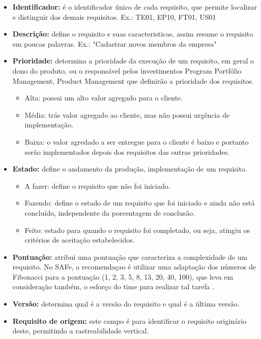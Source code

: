 \begin{itemize}
    \item \textbf{Identificador:} é o identificador único de cada requisito, que permite localizar e distinguir dos demais requisitos.
    \newline Ex.: TE01, EP10, FT01, US01
    \item \textbf{Descrição:} define o requisito e suas caracteristicas, assim resume o requisito em poucas palavras.
    \newline Ex.: "Cadastrar novos membros da empresa" 
    \item \textbf{Prioridade:} determina a prioridade da execução de um requisito, em geral o dono do produto, ou o responsável pelos investimentos Program Portfólio Management, Product Management que definirão a prioridade dos requisitos.
    \begin{itemize}
        \item Alta: possui um alto valor agregado para o cliente.
        \item Média: trás valor agregado ao cliente, mas não possui urgência de implementação.
        \item Baixa: o valor agredado a ser entregue para o cliente é baixo e portanto serão implementados depois dos requisitos das outras prioridades.
    \end{itemize}
    \item \textbf{Estado:} define o andamento da produção, implementação de um requisito.
    \begin{itemize}
        \item A fazer: define o requisito que não foi iniciado.
        \item Fazendo: define o estado de um requisito que foi iniciado e ainda não está concluído, independente da porcentagem de conclusão.
        \item Feito: estado para quando o requisito foi completado, ou seja, atingiu os critérios de aceitação estabelecidos.
    \end{itemize}
    \item \textbf{Pontuação:} atribui uma pontuação que caracteriza a complexidade de um requisito. No SAFe, a recomendaçao é utilizar uma adaptação dos números de Fibonacci para a pontuação (1, 2, 3, 5, 8, 13, 20, 40, 100), que leva em consideração também, o esforço do time para realizar tal tarefa \cite{safe}.
    \item \textbf{Versão:} determina qual é a versão do requisito e qual é a última versão.
    \item \textbf{Requisito de origem:} este campo é para identificar o requisito originário deste, permitindo a rastreabilidade vertical.
\end{itemize}


